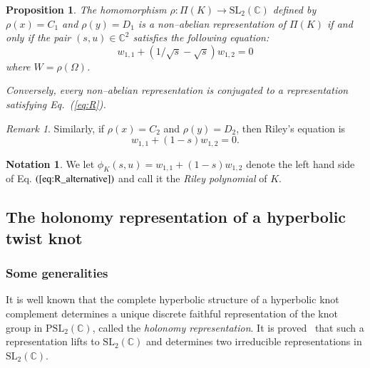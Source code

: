 \documentclass[a4paper]{amsart}
\theoremstyle{plain}
\newtheorem{proposition}[theorem]{Proposition}%
\theoremstyle{definition}
\newtheorem{notation}{Notation}%
\newtheorem*{notation*}{Notation}
\theoremstyle{remark}
\newtheorem{remark}{Remark}%
\newcommand{\C}{{\mathbb C}}
\newcommand{\CC}{{\mathbb C}}
\newcommand{\SL}{{\mathrm{SL}_2(\C)}}
\begin{document}
\begin{proposition} 
The homomorphism $\rho \colon \Pi(K) \to \mathrm{SL}_2(\CC)$ 
defined by $\rho(x)=C_1$ and $\rho(y)=D_1$ 
is a non--abelian representation of $\Pi(K)$ 
if and only if the pair $(s,u) \in \CC^2$ satisfies the following equation: 
\begin{equation}\label{eq:R}
  w_{1, 1}+({1}/{\sqrt{s}}-\sqrt{s})w_{1, 2}=0
\end{equation}
where $W=\rho(\Omega)$. 

Conversely, every non--abelian representation is conjugated to a representation satisfying Eq.~(\ref{eq:R}).
\end{proposition}

\begin{remark}
Similarly, if $\rho(x)=C_2$ and $\rho(y)=D_2$, then Riley's equation is 
\begin{equation}\label{eq:R_alternative}
w_{1, 1}+(1-s)w_{1, 2}=0.
\end{equation}
\end{remark}

\begin{notation}
We let $\phi_K(s, u) = w_{1, 1}+(1-s)w_{1, 2}$ denote the left hand side of
Eq. $(\ref{eq:R_alternative})$ 
and call it the \emph{Riley polynomial} of $K$.
\end{notation}

\subsection{The holonomy representation of a hyperbolic twist knot}
\label{sechyp}
\subsubsection{Some generalities}
    It is well known that the complete hyperbolic structure of a hyperbolic knot complement determines a unique discrete faithful representation of the knot group in $\mathrm{PSL}_2(\CC)$, called the \emph{holonomy representation}. It is proved~\cite[Proposition 1.6.1]{HandBookGT} that such a representation lifts to $\SL$ and determines two irreducible representations in $\SL$.
    
\end{document}
